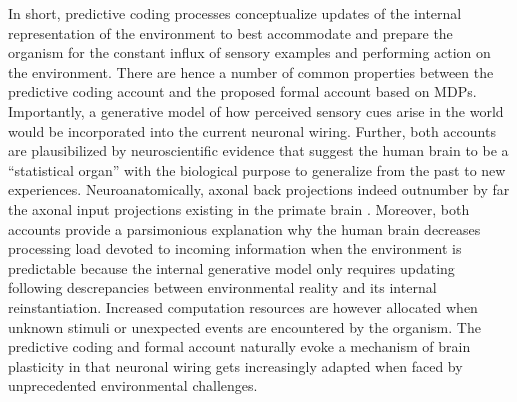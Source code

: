 \documentclass[10pt,letterpaper]{article}
\begin{document}
In short, predictive coding processes
conceptualize updates of the internal representation of the environment
to best accommodate and prepare the organism
for the constant influx of sensory examples and
performing action on the environment.
There are hence a number of common properties
between the predictive coding account
and the proposed formal account based on MDPs.
Importantly,
a generative model of how perceived sensory cues arise in the
world would be incorporated into
the current neuronal wiring.
Further,
both accounts are plausibilized by neuroscientific evidence that suggest
the human brain to be a ``statistical organ'' with the biological purpose to
generalize from the past to new experiences.
Neuroanatomically, axonal
back projections indeed outnumber by far the axonal input projections
existing in the primate brain \citep{salin1995corticocortical}.
Moreover,
both accounts provide a parsimonious explanation why the
human brain decreases processing load devoted to incoming information
when the environment is predictable because the internal generative
model only requires updating following descrepancies between
environmental reality and its internal reinstantiation.
Increased computation resources are however allocated
when unknown stimuli or
unexpected events are encountered by the organism.
The predictive coding and formal account
naturally evoke a mechanism of brain plasticity in that
neuronal wiring gets increasingly adapted
when faced by unprecedented environmental challenges.
\end{document}
